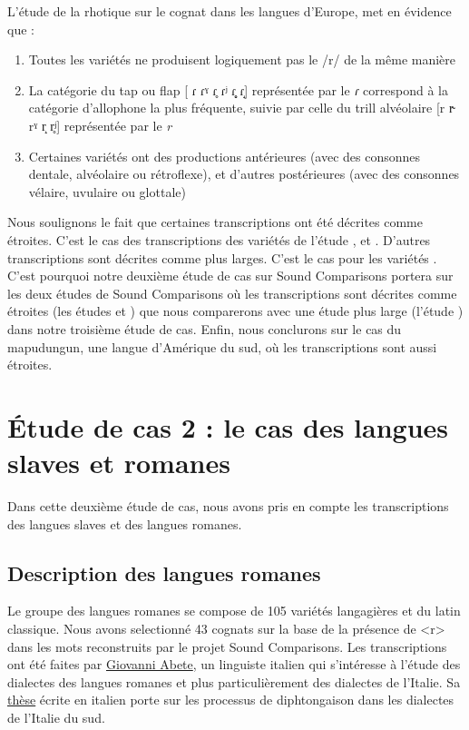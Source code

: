 L'étude de la rhotique sur le cognat  dans les langues d'Europe, met en évidence que :
\begin{enumerate}
	\item Toutes les variétés ne produisent logiquement pas le /r/ de la même manière
	\item La catégorie du tap ou flap [ \small ɾ ɾˠ ɾ̥ ɾʲ ɾ̝̥  ɾ̝\normalsize] représentée par le \textit{ɾ} correspond à la catégorie d'allophone la plus fréquente, suivie par celle du trill alvéolaire [r r̴ rˠ r̝  r̥ʲ] représentée par le \textit{r}
	\item Certaines variétés ont des productions antérieures (avec des consonnes dentale, alvéolaire ou rétroflexe), et d'autres postérieures (avec des consonnes vélaire, uvulaire ou glottale)
\end{enumerate}

Nous soulignons le fait que certaines transcriptions ont été décrites comme étroites. C'est le cas des transcriptions des variétés de l'étude ,  et . D'autres transcriptions sont décrites comme plus larges. C'est le cas pour les variétés .\\
C'est pourquoi notre deuxième étude de cas sur Sound Comparisons portera sur les deux études de Sound Comparisons où les transcriptions sont décrites comme étroites (les études  et ) que nous comparerons avec une étude plus large (l'étude ) dans notre troisième étude de cas. Enfin, nous conclurons sur le cas du mapudungun, une langue d'Amérique du sud, où les transcriptions sont aussi étroites.

\section{Étude de cas 2 : le cas des langues slaves et romanes}

Dans cette deuxième étude de cas, nous avons pris en compte les transcriptions des langues slaves et des langues romanes.

\subsection{Description des langues romanes}

Le groupe des langues romanes se compose de 105 variétés langagières et du latin classique. Nous avons selectionné 43 cognats sur la base de la présence de <r> dans les mots reconstruits par le projet Sound Comparisons. Les transcriptions ont été faites par \href{https://unina.academia.edu/GiovanniAbete}{Giovanni Abete}, un linguiste italien qui s'intéresse à l'étude des dialectes des langues romanes et plus particulièrement des dialectes de l'Italie. Sa \href{https://www.academia.edu/2362845/I_processi_di_dittongazione_nei_dialetti_dell_Italia_meridionale_Un_approccio_sperimentale}{thèse} \parencite{abeteProcessiDiDittongazione2010} écrite en italien porte sur les processus de diphtongaison dans les dialectes de l'Italie du sud.\\

